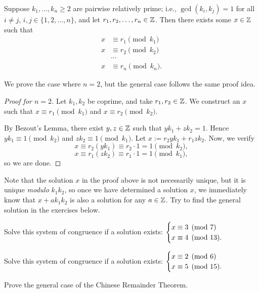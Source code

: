 \documentclass{article}
\begin{document}
\begin{theorem}
Suppose $k_1, \ldots, k_n \geq 2$ are pairwise relatively prime; i.e., $\gcd(k_i, k_j) = 1$ for all $i\neq j$, $i,j\in \{1, 2, \ldots, n\}$, and let $r_1, r_2, \ldots, r_n\in\mathbb Z$. Then there exists some $x\in\mathbb Z$ such that
\begin{align*}
    x &\equiv r_1 \pmod{k_1} \\
    x &\equiv r_2 \pmod{k_2} \\
    &\cdots \\
    x &\equiv r_n \pmod{k_n}.
\end{align*}
\end{theorem}
We prove the case where $n=2$, but the general case follows the same proof idea.
\begin{proof}[Proof for $n=2$]
Let $k_1, k_2$ be coprime, and take $r_1, r_2\in\mathbb Z$. We construct an $x$ such that $x\equiv r_1\pmod{k_1}$ and $x\equiv r_2\pmod{k_2}$.

By Bezout's Lemma, there exist $y,z\in \mathbb Z$ such that $yk_1 + zk_2 = 1$. Hence $yk_1 \equiv 1\pmod{k_2}$ and $zk_2 \equiv 1\pmod{k_1}$. Let $x := r_2yk_1 + r_1zk_2$. Now, we verify
$$x\equiv r_2(yk_1) \equiv r_2\cdot 1 = 1\pmod{k_2},$$
$$x\equiv r_1(zk_2) \equiv r_1\cdot 1 = 1\pmod{k_1},$$
so we are done.
\end{proof}

Note that the solution $x$ in the proof above is not necessarily unique, but it is unique \textit{modulo} $k_1k_2$, so once we have determined a solution $x$, we immediately know that $x + ak_1k_2$ is also a solution for any $a\in\mathbb Z$. Try to find the general solution in the exercises below.
\begin{exercise}
Solve this system of congruence if a solution exists: $\displaystyle\begin{cases} 
x\equiv 3 \pmod 7 \\ x\equiv 4\pmod{13}.
\end{cases}$
\end{exercise}
\begin{exercise}
Solve this system of congruence if a solution exists: $\displaystyle\begin{cases}x\equiv 2\pmod 6 \\ x\equiv 5\pmod{15}.\end{cases}$
\end{exercise}
\begin{exercise}
Prove the general case of the Chinese Remainder Theorem.
\end{exercise}
\end{document}
